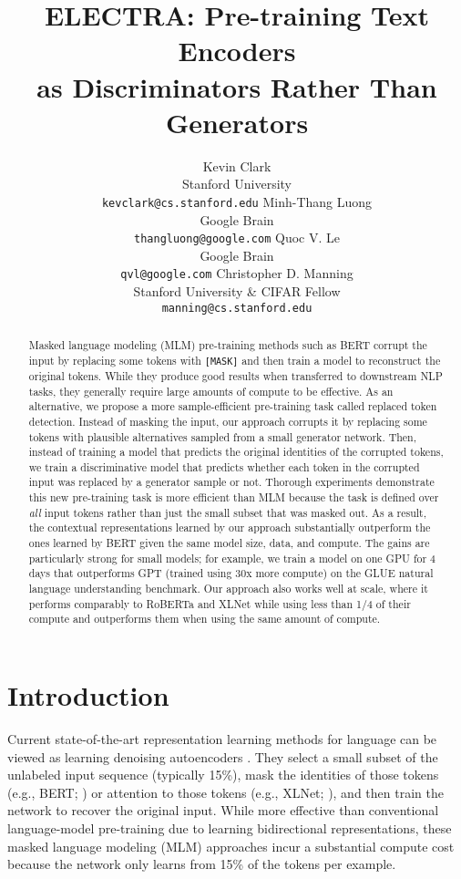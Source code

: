 \documentclass{article}
\title{ELECTRA: Pre-training Text Encoders\\ as Discriminators Rather Than Generators}
\author{Kevin Clark\\Stanford University\\{\tt kevclark@cs.stanford.edu}
\And Minh-Thang Luong\\Google Brain\\{\tt thangluong@google.com}
\And Quoc V. Le\\Google Brain\\{\tt qvl@google.com}
\And Christopher D. Manning\\Stanford University \& CIFAR Fellow\\{\tt manning@cs.stanford.edu}
}
\begin{document}
\maketitle

\begin{abstract}
Masked language modeling (MLM) pre-training methods such as BERT corrupt the input by replacing some tokens with \texttt{[MASK]} and then train a model to reconstruct the original tokens.
While they produce good results when transferred to downstream NLP tasks, they generally require large amounts of compute to be effective.
As an alternative, we propose a more sample-efficient pre-training task called replaced token detection.
Instead of masking the input, our approach corrupts it by replacing some tokens with plausible alternatives sampled from a small generator network.
Then, instead of training a model that predicts the original identities of the corrupted tokens, we train a discriminative model that predicts whether each token in the corrupted input was replaced by a generator sample or not.
Thorough experiments demonstrate this new pre-training task is more efficient than MLM because the task is defined over {\it all} input tokens rather than just the small subset that was masked out. 
As a result, the contextual representations learned by our approach substantially outperform the ones learned by BERT given the same model size, data, and compute.
The gains are particularly strong for small models; for example, we train a model on one GPU for 4 days that outperforms GPT (trained using 30x more compute) on the GLUE natural language understanding benchmark.
Our approach also works well at scale, where it performs comparably to RoBERTa and XLNet while using less than 1/4 of their compute and outperforms them when using the same amount of compute. 
\end{abstract}

\section{Introduction}

Current state-of-the-art representation learning methods for language can be viewed as learning denoising autoencoders \citep{vincent2008extracting}.
They select a small subset of the unlabeled input sequence (typically 15\%), mask the identities of those tokens (e.g., BERT; \citet{devlin2018bert}) or attention to those tokens (e.g., XLNet; \citet{yang2019xlnet}), and then train the network to recover the original input.
While more effective than conventional language-model pre-training due to learning bidirectional representations, these masked language modeling (MLM) approaches incur a substantial compute cost because the network only learns from 15\% of the tokens per example.
\end{document}
